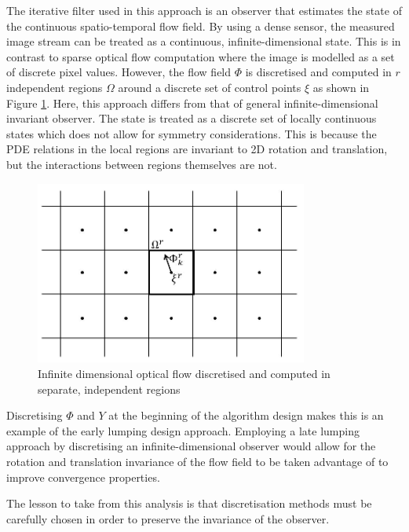 The iterative filter used in this approach is an observer that estimates the state of the continuous spatio-temporal flow field. By using a dense sensor, the measured image stream can be treated as a continuous, infinite-dimensional state. This is in contrast to sparse optical flow computation where the image is modelled as a set of discrete pixel values. However, the flow field $\Phi$ is discretised and computed in $r$ independent regions $\Omega$ around a discrete set of control points $\xi$ as shown in Figure \ref{fig:flow_regions}. Here, this approach differs from that of general infinite-dimensional invariant observer. The state is treated as a discrete set of locally continuous states which does not allow for symmetry considerations. This is because the PDE relations in the local regions are invariant to 2D rotation and translation, but the interactions between regions themselves are not. 

\begin{figure}
\centering
  \includegraphics[width=0.8\textwidth,trim = 0mm 0mm 0mm 0mm,clip]{./Figures/flow_regions.jpg}
  \caption{Infinite dimensional optical flow discretised and computed in separate, independent regions} \label{fig:flow_regions}
\end{figure}

Discretising $\Phi$ and $Y$ at the beginning of the algorithm design makes this is an example of the early lumping design approach. Employing a late lumping approach by discretising an infinite-dimensional observer would allow for the rotation and translation invariance of the flow field to be taken advantage of to improve convergence properties. 

The lesson to take from this analysis is that discretisation methods must be carefully chosen in order to preserve the invariance of the observer.


